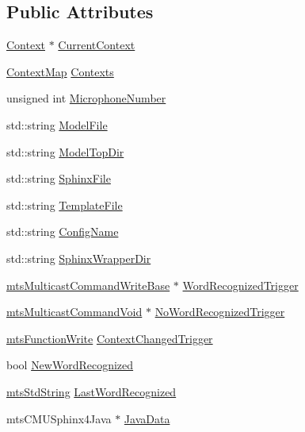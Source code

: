 \subsection*{Public Attributes}
\begin{DoxyCompactItemize}
\item 
\hyperlink{classmts_c_m_u_sphinx4_1_1_context}{Context} $\ast$ \hyperlink{classmts_c_m_u_sphinx4_af18513545284a63b71ebe36511d7a6b1}{Current\+Context}
\item 
\hyperlink{classmts_c_m_u_sphinx4_a5cf708712c99bce418627789835920d8}{Context\+Map} \hyperlink{classmts_c_m_u_sphinx4_a9ab5ad8754d6f798d08792ca5c7c0e14}{Contexts}
\item 
unsigned int \hyperlink{classmts_c_m_u_sphinx4_a3b59d452d70874fdb82e540347eca1e6}{Microphone\+Number}
\item 
std\+::string \hyperlink{classmts_c_m_u_sphinx4_a4722ad000506adea55df9f1167feae2a}{Model\+File}
\item 
std\+::string \hyperlink{classmts_c_m_u_sphinx4_a3d18ffea27a2019fe8f9deb44645b468}{Model\+Top\+Dir}
\item 
std\+::string \hyperlink{classmts_c_m_u_sphinx4_a7bd334f3fc83a2e02835b04c3aa97429}{Sphinx\+File}
\item 
std\+::string \hyperlink{classmts_c_m_u_sphinx4_af225e6118d17b5bd9d325a0876d7b2a2}{Template\+File}
\item 
std\+::string \hyperlink{classmts_c_m_u_sphinx4_ae28ac772c7e862fb2207c09cb4c39137}{Config\+Name}
\item 
std\+::string \hyperlink{classmts_c_m_u_sphinx4_a27347a99b66802545ec6c64aa85aebb3}{Sphinx\+Wrapper\+Dir}
\item 
\hyperlink{classmts_multicast_command_write_base}{mts\+Multicast\+Command\+Write\+Base} $\ast$ \hyperlink{classmts_c_m_u_sphinx4_a7a05ef0831adccfb72bebfcb22bbfd3b}{Word\+Recognized\+Trigger}
\item 
\hyperlink{classmts_multicast_command_void}{mts\+Multicast\+Command\+Void} $\ast$ \hyperlink{classmts_c_m_u_sphinx4_abb3de961c7753e3231b01b3edc593279}{No\+Word\+Recognized\+Trigger}
\item 
\hyperlink{classmts_function_write}{mts\+Function\+Write} \hyperlink{classmts_c_m_u_sphinx4_a117f1e3a1942cb21a1c54666f17c153f}{Context\+Changed\+Trigger}
\item 
bool \hyperlink{classmts_c_m_u_sphinx4_a80a401c501dc956347fb3e71716d3eb3}{New\+Word\+Recognized}
\item 
\hyperlink{mts_generic_object_proxy_8h_adbc21bfbf98367e582bf8a263b7e711f}{mts\+Std\+String} \hyperlink{classmts_c_m_u_sphinx4_a9ca792d5066dcae0a2edfc93c0c51480}{Last\+Word\+Recognized}
\item 
mts\+C\+M\+U\+Sphinx4\+Java $\ast$ \hyperlink{classmts_c_m_u_sphinx4_a16f510ea20ba70000841f1e8be81b0b9}{Java\+Data}
\end{DoxyCompactItemize}

